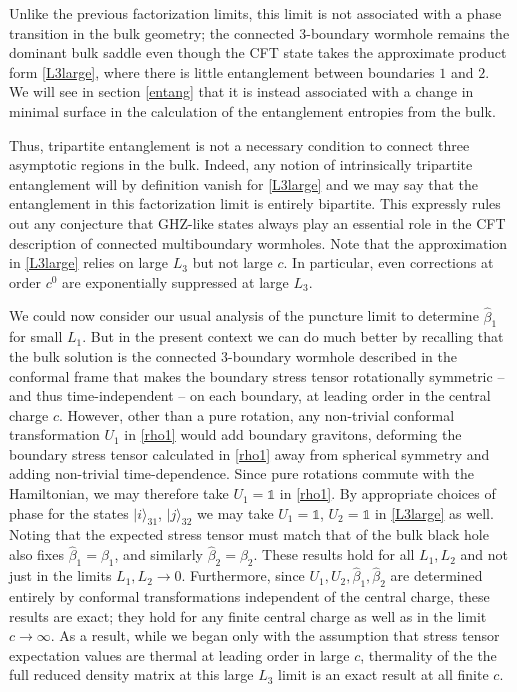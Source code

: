 \documentclass[12pt]{article}
\numberwithin{equation}{section}
\begin{document}
Unlike the previous factorization limits, this limit is not associated with a phase transition in the bulk geometry; the connected 3-boundary wormhole remains the dominant bulk saddle even though the CFT state takes the approximate product form \eqref{L3large}, where there is little entanglement between boundaries $1$ and $2$. We will see in section \ref{entang} that it is instead associated with a change in minimal surface in the calculation of the entanglement entropies from the bulk.

Thus, tripartite entanglement is not a necessary condition to connect three asymptotic regions in the bulk. Indeed, any notion of intrinsically tripartite entanglement will by definition vanish for  \eqref{L3large} and we may say that the entanglement in this factorization limit is entirely bipartite.  This expressly rules out any conjecture that GHZ-like states always play an essential role in the CFT description of connected multiboundary wormholes.  Note that the approximation in \eqref{L3large} relies on large $L_3$ but not large $c$.  In particular, even corrections at order $c^0$  are exponentially suppressed at large $L_3$.


We could now consider our usual analysis of the puncture limit to determine $\hat \beta_1$ for small $L_1$. But in the present context we can do much better by recalling that the bulk solution is the connected 3-boundary wormhole described in the conformal frame that makes the boundary stress tensor rotationally symmetric -- and thus time-independent -- on each boundary, at leading order in the central charge $c$.  However, other than a pure rotation, any non-trivial conformal transformation $U_1$ in \eqref{rho1} would add boundary gravitons, deforming the boundary stress tensor calculated in \eqref{rho1} away from spherical symmetry and adding non-trivial time-dependence.  Since pure rotations commute with the Hamiltonian, we may therefore take $U_1 =\mathds{1}$ in \eqref{rho1}. By appropriate choices of phase for the states $|i\rangle_{31}$,  $|j\rangle_{32}$ we may  take $U_1 =\mathds{1}$,  $U_2 = \mathds{1}$ in \eqref{L3large} as well.   Noting that the expected stress tensor must match that of the bulk black hole also fixes $\hat \beta_1 = \beta_1$, and similarly $\hat \beta_2 = \beta_2$. These results hold for all $L_1,L_2$ and not just in the limits $L_1,L_2 \rightarrow 0$. Furthermore, since $U_1,U_2,\hat \beta_1, \hat \beta_2$ are determined entirely by conformal transformations independent of the central charge, these results are exact; they hold for any finite central charge as well as in the limit $c \rightarrow \infty$. As a result, while we began only with the assumption that stress tensor expectation values are thermal at leading order in large $c$, thermality of the the full reduced density matrix at this large $L_3$ limit is an exact result at all finite $c$.
\end{document}
